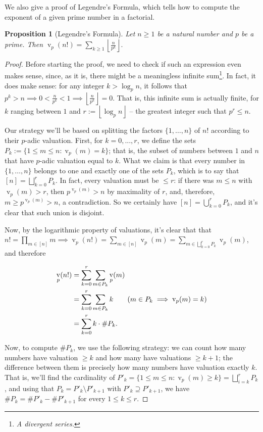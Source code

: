\documentclass[11pt]{article}
\newtheorem{proposition}[theorem]{Proposition}
\theoremstyle{remark}
\newcommand{\floor}[1]{\left\lfloor #1 \right\rfloor}
\newcommand{\vs}{\vspace{10px}}
\DeclareMathOperator{\val}{v}
\DeclareMathOperator{\vv}{v}
\begin{document}
We also give a proof of Legendre's Formula, which tells how to compute the exponent of a given prime number in a factorial.

\begin{proposition}[Legendre's Formula] \label{prop:legendres_formula}
    Let $n\ge 1$ be a natural number and $p$ be a prime. Then $\val_p(n!) =\sum\limits_{k\ge 1}\left\lfloor \frac{n}{p^k}\right \rfloor.$
\end{proposition}
\vs
\begin{proof}
    Before starting the proof, we need to check if such an expression even makes sense, since, as it is, there might be a meaningless infinite sum\footnote{\textit{A divergent series.}}. In fact, it does make sense: for any integer $k> \log_p n$, it follows that $p^k > n\implies0< \frac{n}{p^k}<1\implies \floor{\frac{n}{p^k}}=0$. That is, this infinite sum is actually finite, for $k$ ranging between $1$ and $r:=\floor{\log_p n}$ -- the greatest integer such that $p^r \le n$.
    \vs

    Our strategy we'll be based on splitting the factors $\{1,\ldots, n\}$ of $n!$ according to their $p$-adic valuation. First, for $k=0, ..., r$, we define the sets $P_k:= \{1\le m\le n: \vv_p(m) = k\}$; that is, the subset of numbers between $1$ and $n$ that have $p$-adic valuation equal to $k$. What we claim is that every number in $\{1,\ldots, n\}$ belongs to one and exactly one of the sets $P_k$, which is to say that $[n]= \bigsqcup\limits_{k=0}^rP_k$. In fact, every valuation must be $\le r$: if there was $m\le n$ with $\val_p(m)> r$, then  $p^{\val_p(m)}>n$ by maximality of $r$, and, therefore, $m\ge p^{\val_p(m)}>n$, a contradiction. So we certainly have $[n]=\bigcup\limits_{k=0}^r P_k$, and it's clear that such union is disjoint.

    Now, by the logarithmic property of valuations, it's clear that that $n! = \prod\limits_{m\in [n]}m\implies \val_p(n!) = \sum\limits_{m\in [n]}\val_p(m)=\sum\limits_{m\in \bigsqcup_{k=0}^rP_k} \val_p(m)$, and therefore 
    
    \begin{align*}
        \val_p(n!)&=\sum\limits_{k=0}^r\sum\limits_{m\in P_k}\val_p(m) \\
        &= \sum_{k=0}^r\sum_{m\in P_k}k \tag*{($m\in P_k\implies \val_p(m)=k$)}\\
        &= \sum_{k=0}^r k\cdot \#P_k.
    \end{align*}
    \vs
    
    Now, to compute $\#P_k$, we use the following strategy: we can count how many numbers have valuation $\ge k$ and how many have valuations $\ge k+1$; the difference between them is precisely how many numbers have valuation exactly $k$. That is, we'll find the cardinality of $P'_k = \{1\le m\le n: \val_p(m)\ge k\}= \bigsqcup\limits_{i=k}^rP_k$, and using that $P_k= P'_k\setminus P'_{k+1}$ with $P'_k\supseteq P'_{k+1}$, we have $\#P_k = \#P'_k - \#P'_{k+1}$ for every $1\le k\le r$.
    


\end{proof}
\end{document}
